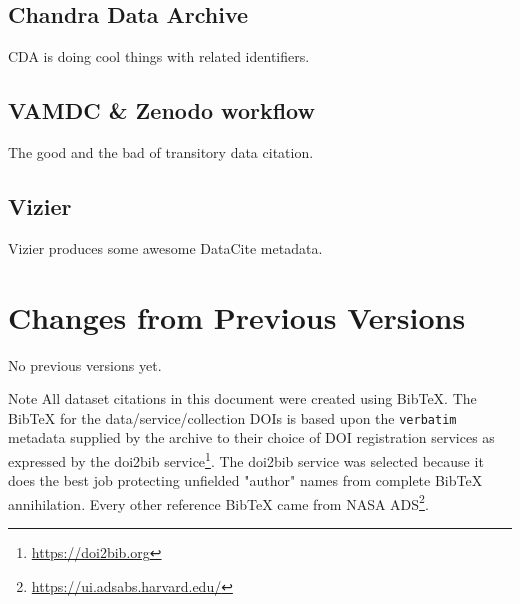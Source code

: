 \documentclass[11pt,a4paper]{ivoa}
\begin{document}
\subsection{Chandra Data Archive}
CDA is doing cool things with related identifiers.
\subsection{VAMDC \& Zenodo workflow}
The good and the bad of transitory data citation.
\subsection{Vizier}
Vizier produces some awesome DataCite metadata.

\section{Changes from Previous Versions}

No previous versions yet.

\clearpage
\begin{admonition}{Note}
All dataset citations in this document were created using BibTeX. The BibTeX for the data/service/collection DOIs is based upon the \texttt{verbatim} metadata supplied by the archive to their choice of DOI registration services as expressed by the doi2bib service\footnote{\url{https://doi2bib.org}}. The doi2bib service was selected because it does the best job protecting unfielded "author" names from complete BibTeX annihilation.
Every other reference BibTeX came from NASA ADS\footnote{\url{https://ui.adsabs.harvard.edu/}}.
\end{admonition}%
%

\end{document}
